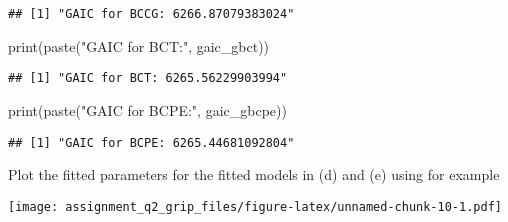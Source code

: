 \documentclass[
]{article}
\newenvironment{Shaded}{\begin{snugshade}}{\end{snugshade}}
\newcommand{\AttributeTok}[1]{\textcolor[rgb]{0.77,0.63,0.00}{#1}}
\newcommand{\CommentTok}[1]{\textcolor[rgb]{0.56,0.35,0.01}{\textit{#1}}}
\newcommand{\DecValTok}[1]{\textcolor[rgb]{0.00,0.00,0.81}{#1}}
\newcommand{\FunctionTok}[1]{\textcolor[rgb]{0.00,0.00,0.00}{#1}}
\newcommand{\NormalTok}[1]{#1}
\newcommand{\OtherTok}[1]{\textcolor[rgb]{0.56,0.35,0.01}{#1}}
\newcommand{\SpecialCharTok}[1]{\textcolor[rgb]{0.00,0.00,0.00}{#1}}
\newcommand{\StringTok}[1]{\textcolor[rgb]{0.31,0.60,0.02}{#1}}
\begin{document}
\begin{verbatim}
## [1] "GAIC for BCCG: 6266.87079383024"
\end{verbatim}

\begin{Shaded}
\begin{Highlighting}[]
\FunctionTok{print}\NormalTok{(}\FunctionTok{paste}\NormalTok{(}\StringTok{"GAIC for BCT:"}\NormalTok{, gaic\_gbct))}
\end{Highlighting}
\end{Shaded}

\begin{verbatim}
## [1] "GAIC for BCT: 6265.56229903994"
\end{verbatim}

\begin{Shaded}
\begin{Highlighting}[]
\FunctionTok{print}\NormalTok{(}\FunctionTok{paste}\NormalTok{(}\StringTok{"GAIC for BCPE:"}\NormalTok{, gaic\_gbcpe))}
\end{Highlighting}
\end{Shaded}

\begin{verbatim}
## [1] "GAIC for BCPE: 6265.44681092804"
\end{verbatim}

Plot the fitted parameters for the fitted models in (d) and (e) using
for example

\begin{Shaded}
\end{Shaded}

\texttt{[image: assignment\_q2\_grip\_files/figure-latex/unnamed-chunk-10-1.pdf]}

\begin{Shaded}
\end{Shaded}
\end{document}
